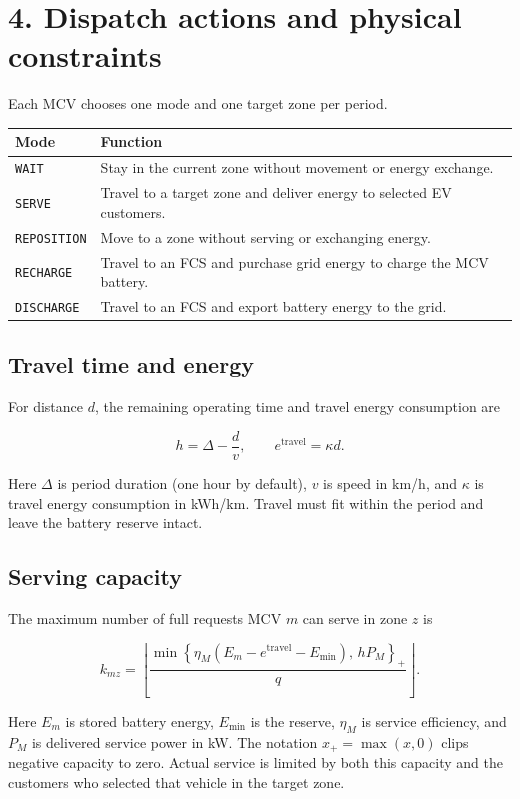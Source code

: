 \documentclass[11pt,letterpaper]{article}
\begin{document}
\section*{4. Dispatch actions and physical constraints}


Each MCV chooses one mode and one target zone per period.

\begin{center}
\begin{tabularx}{\textwidth}{@{}lX@{}}
\toprule
\textbf{Mode} & \textbf{Function} \\
\midrule
\texttt{WAIT} & Stay in the current zone without movement or energy exchange. \\
\texttt{SERVE} & Travel to a target zone and deliver energy to selected EV customers. \\
\texttt{REPOSITION} & Move to a zone without serving or exchanging energy. \\
\texttt{RECHARGE} & Travel to an FCS and purchase grid energy to charge the MCV battery. \\
\texttt{DISCHARGE} & Travel to an FCS and export battery energy to the grid. \\
\bottomrule
\end{tabularx}
\end{center}


\subsection*{Travel time and energy}


For distance $d$, the remaining operating time and travel energy consumption are

\[
h=\Delta-\frac{d}{v},
\qquad
e^{\mathrm{travel}}=\kappa d.
\]


Here $\Delta$ is period duration (one hour by default), $v$ is speed in km/h, and $\kappa$ is travel energy consumption in kWh/km. Travel must fit within the period and leave the battery reserve intact.

\subsection*{Serving capacity}


The maximum number of full requests MCV $m$ can serve in zone $z$ is

\[
k_{mz}=
\left\lfloor
\frac{
\min\left\{
\eta_M(E_m-e^{\mathrm{travel}}-E_{\min}),\,hP_M
\right\}_+
}{q}
\right\rfloor.
\]


Here $E_m$ is stored battery energy, $E_{\min}$ is the reserve, $\eta_M$ is service efficiency, and $P_M$ is delivered service power in kW. The notation $x_+=\max(x,0)$ clips negative capacity to zero. Actual service is limited by both this capacity and the customers who selected that vehicle in the target zone.
\end{document}
